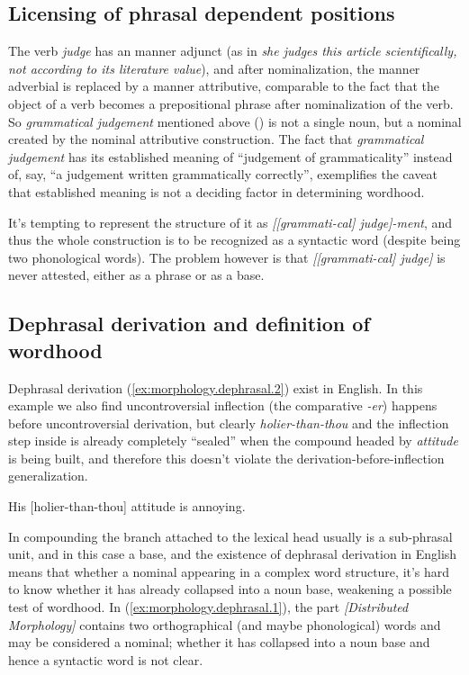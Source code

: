 \documentclass[UTF8, a4paper, oneside, scheme=plain, 12pt]{ctexbook}
\newcommand*{\citepage}[1]{p.~{#1}}
\newcommand{\form}[1]{\emph{#1}}
\begin{document}
\subsection{Licensing of phrasal dependent positions}\label{sec:pos.word.semantics}

The verb \form{judge} has 
an manner adjunct 
(as in \form{she judges this article scientifically, 
not according to its literature value}),
and after nominalization,
the manner adverbial is 
replaced by a manner attributive,
comparable to the fact that the object of a verb 
becomes a prepositional phrase after nominalization of the verb. 
So \form{grammatical judgement} mentioned above
() is not a single noun,
but a nominal created by the nominal attributive construction.
The fact that \form{grammatical judgement} has its established meaning 
of ``judgement of grammaticality''
instead of, say, ``a judgement written grammatically correctly'',
exemplifies the caveat 
that established meaning is not a deciding factor in determining wordhood.

It's tempting to represent the structure of it as 
\form{[[grammati-cal] judge]-ment},
and thus the whole construction is to be recognized as a syntactic word
(despite being two phonological words).
The problem however is that \form{[[grammati-cal] judge]}
is never attested,
either as a phrase or as a base.

\subsection{Dephrasal derivation and definition of wordhood}\label{sec:morphology.dephrasal}

Dephrasal derivation (\ref{ex:morphology.dephrasal.2}) exist in English.
In this example we also find uncontroversial inflection (the comparative \form{-er}) happens 
before uncontroversial derivation,
but clearly \form{holier-than-thou} 
and the inflection step inside is already completely ``sealed''
when the compound headed by \form{attitude} is being built,
and therefore this doesn't violate the derivation-before-inflection generalization.

\begin{exe}
    \ex\label{ex:morphology.dephrasal.2} His [holier-than-thou] attitude is annoying. \citep[\citepage{1646}]{cgel}
\end{exe}

In compounding the branch attached to the lexical head 
usually is a sub-phrasal unit, and in this case a base,
and the existence of dephrasal derivation in English 
means that whether a nominal appearing in a complex word structure, 
it's hard to know whether it has already collapsed into a noun base,
weakening a possible test of wordhood.
In (\ref{ex:morphology.dephrasal.1}),
the part \form{[Distributed Morphology]}
contains two orthographical (and maybe phonological) words
and may be considered a nominal;
whether it has collapsed into a noun base and hence a syntactic word is not clear.
\end{document}
